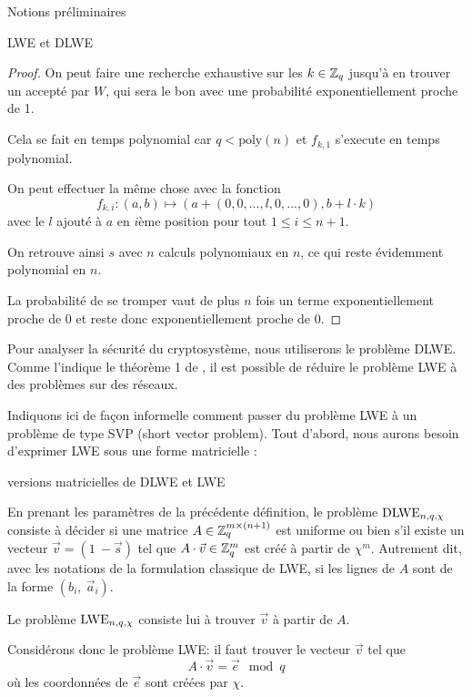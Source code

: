 \begin{section}{Notions préliminaires}
\begin{subsection}{LWE et DLWE}
\begin{proof}
	On peut faire une recherche exhaustive sur les $k \in \mathbb{Z}_q$ jusqu'à en trouver un accepté par $W$, qui sera le
	bon avec une probabilité exponentiellement proche de 1.
	
	Cela se fait en temps polynomial car $q < \text{poly}(n)$ et $f_{k,1}$ s'execute en temps polynomial.
	
	On peut effectuer la même chose avec la fonction
	\[f_{k,i}: (a,b) \mapsto (a + (0, 0, ..., l, 0, ..., 0), b + l \cdot k) \]
	avec le $l$ ajouté à $a$ en $i$ème position pour tout $1 \leq i \leq n+1$.
	
	On retrouve ainsi $s$ avec $n$ calculs polynomiaux en $n$, ce qui reste évidemment polynomial en $n$.
	
	La probabilité de se tromper vaut de plus $n$ fois un terme exponentiellement proche de 0 et reste donc
	exponentiellement proche de 0.
	\end{proof}

	Pour analyser la sécurité du cryptosystème, nous utiliserons le problème DLWE. Comme l'indique le théorème 1 de
	\cite{C:GenSahWat13}, il est possible de réduire le problème LWE à des problèmes sur des réseaux.

	Indiquons ici de façon informelle comment passer du problème LWE à un problème de type SVP (short vector
	problem). Tout d'abord, nous aurons besoin d'exprimer LWE sous une forme matricielle :

	\begin{definition}{versions matricielles de DLWE et LWE}

	En prenant les paramètres de la précédente définition, le problème $\text{DLWE}_{n,q,\chi}$ consiste à décider si une matrice $A
	\in \mathbb{Z}_q^{m \times (n+1)}$ est uniforme ou bien s'il existe un vecteur $\vec{v} = (1\: -\!\vec{s})$ tel que $A
	\cdot \vec{v} \in \mathbb{Z}_q^{m}$ est créé à partir de $\chi^m$. Autrement dit, avec les notations de la formulation
	classique de LWE, si les lignes de $A$ sont de la forme $(b_i,\: \vec{a}_i)$.
	
	Le problème $\text{LWE}_{n,q,\chi}$ consiste lui à trouver $\vec{v}$ à partir de $A$.
	\end{definition}

	Considérons donc le problème LWE: il faut trouver le vecteur $\vec{v}$ tel que
	\[ A\cdot \vec{v} = \vec{e} \mod q \]
	où les coordonnées de $\vec{e}$ sont créées par $\chi$.


\end{subsection}
\end{section}
